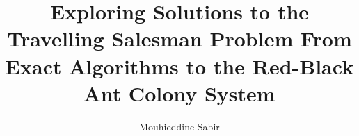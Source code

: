 \title{Exploring Solutions to the Travelling Salesman Problem From Exact Algorithms to the Red-Black Ant Colony System}
\author{Mouhieddine Sabir}


\coadvisorOne{}
\coadvisorOneUniversity{}

